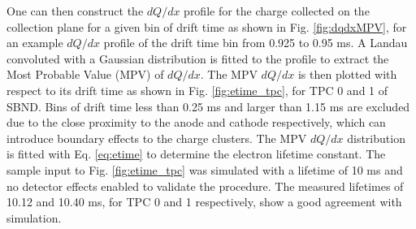 One can then construct the $dQ/dx$ profile for the charge collected on the collection plane for a given bin of drift time as shown in Fig. \ref{fig:dqdxMPV}, for an example $dQ/dx$ profile of the drift time bin from 0.925 to 0.95 ms.
A Landau convoluted with a Gaussian distribution \cite{Passage} is fitted to the profile to extract the Most Probable Value (MPV) of $dQ/dx$.                                 
The MPV $dQ/dx$ is then plotted with respect to its drift time as shown in Fig. \ref{fig:etime_tpc}, for TPC 0 and 1 of SBND.                                                                          
Bins of drift time less than 0.25 ms and larger than 1.15 ms are excluded due to the close proximity to the anode and cathode respectively, which can introduce boundary effects to the charge clusters.
The MPV $dQ/dx$ distribution is fitted with Eq. \ref{eq:etime} to determine the electron lifetime constant.
The sample input to Fig. \ref{fig:etime_tpc} was simulated with a lifetime of 10 ms and no detector effects enabled to validate the procedure.                                       
The measured lifetimes of 10.12 and 10.40 ms, for TPC 0 and 1 respectively, show a good agreement with simulation. 
